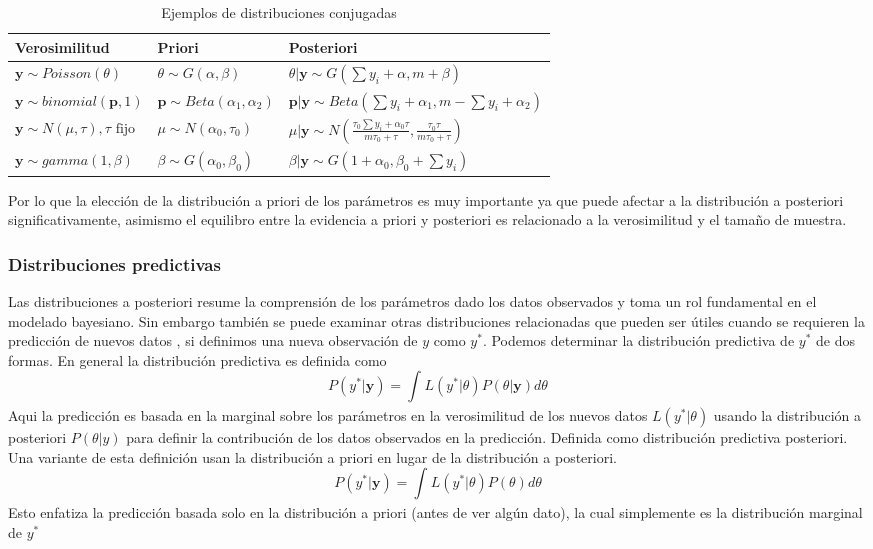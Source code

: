 \begin{table}[htb]
\centering
\begin{tabular}{|p{4cm}|p{4cm}|p{7cm}|}
\hline
\textbf{Verosimilitud} & \textbf{Priori}& \textbf{Posteriori} \\ \hline
$\mathbf{y} \sim Poisson(\theta)$ & $\theta \sim G(\alpha, \beta)$ & $\theta|\mathbf{y} \sim G(\sum{y}_{i} + \alpha,m + \beta)$ \\
$\mathbf{y} \sim binomial(\mathbf{p},1)$ & $\mathbf{p} \sim Beta({\alpha}_{1}, {\alpha}_{2})$ & $\mathbf{p}|\mathbf{y} \sim Beta(\sum{y}_{i} + {\alpha}_{1},m - \sum {y}_{i} + {\alpha}_{2})$ \\
$\mathbf{y} \sim N(\mu, \tau), \tau \text{ fijo}$ & $\mu \sim N({\alpha}_{0}, {\tau}_{0})$ & $\mu|\mathbf{y} \sim N\left( \frac{{\tau}_{0}\sum {y}_{i} + {\alpha}_{0} \tau}{m {\tau}_{0} + \tau}, \frac{{\tau}_{0}\tau}{m{\tau}_{0}+\tau} \right)$ \\
$\mathbf{y} \sim gamma(1,\beta)$ & $\beta \sim G({\alpha}_{0}, {\beta}_{0})$ & $\beta|\mathbf{y} \sim G(1 + {\alpha}_{0}, {\beta}_{0} + \sum{y}_{i})$ \\
\hline
\end{tabular}
\caption{Ejemplos de distribuciones conjugadas}
\label{tabla:distribuciones}
\end{table}

Por lo que la elección de la distribución a priori de los parámetros es muy importante ya que puede afectar a la distribución a posteriori significativamente, asimismo el equilibro entre la evidencia a priori y posteriori es relacionado a la verosimilitud y el tamaño de muestra.

\subsubsection{Distribuciones predictivas}
Las distribuciones a posteriori resume la comprensión de los parámetros dado los datos observados y toma un rol fundamental en el modelado bayesiano. Sin embargo también se puede examinar otras distribuciones relacionadas que pueden ser útiles cuando se requieren la predicción de nuevos datos \citep{lawson2018bayesian}, si definimos una nueva observación de $y$ como $y^*$. Podemos determinar la distribución predictiva de $y^*$ de dos formas. En general la distribución predictiva es definida como
$$
P(y^* | \mathbf{y}) = \int_{}^{} L(y^* | \theta)P(\theta | \mathbf{y})d\theta
$$
Aqui la predicción es basada en la marginal sobre los parámetros en la verosimilitud de los nuevos datos $L(y^* | \theta)$ usando la distribución a posteriori $P(\theta | y)$ para definir la contribución de los datos observados en la predicción. Definida como distribución predictiva posteriori. Una variante de esta definición usan la distribución a priori en lugar de la distribución a posteriori.
$$
P(y^* | \mathbf{y}) = \int_{}^{} L(y^* | \theta)P(\theta)d\theta
$$
Esto enfatiza la predicción basada solo en la distribución a priori (antes de ver algún dato), la cual simplemente es la distribución marginal de $y^*$

